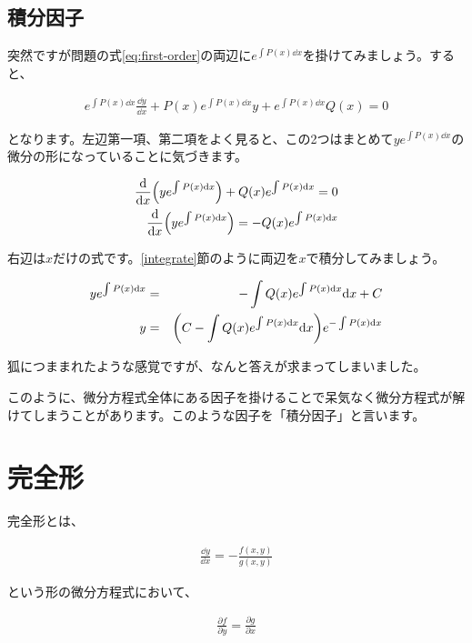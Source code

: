 \subsection{積分因子}
\label{first-order--integrating-factor}
突然ですが問題の式\ref{eq:first-order}の両辺に$e^{\int P(x)\dd x}$を掛けてみましょう。すると、

\begin{eqnarray}
    e^{\int P(x)\dd x}\frac{\dd y}{\dd x}+P(x)e^{\int P(x)\dd x}y+e^{\int P(x)\dd x}Q(x)=0
\end{eqnarray}

となります。左辺第一項、第二項をよく見ると、この2つはまとめて$ye^{\int P(x)\dd x}$の微分の形になっていることに気づきます。

\begin{eqnarray}
    \frac{\dd}{\dd x}\pqty{ye^{\int P(x)\dd x}}+Q(x)e^{\int P(x)\dd x}=0 \nonumber \\
    \frac{\dd}{\dd x}\pqty{ye^{\int P(x)\dd x}}=-Q(x)e^{\int P(x)\dd x}
\end{eqnarray}

右辺は$x$だけの式です。\ref{integrate}節のように両辺を$x$で積分してみましょう。


\begin{eqnarray}
    ye^{\int P(x)\dd x}&=&-\int Q(x)e^{\int P(x)\dd x} \dd x+C \nonumber \\
    y&=&\pqty{C-\int Q(x)e^{\int P(x)\dd x}\dd x}e^{-\int P(x)\dd x}
\end{eqnarray}

狐につままれたような感覚ですが、なんと答えが求まってしまいました。

このように、微分方程式全体にある因子を掛けることで呆気なく微分方程式が解けてしまうことがあります。このような因子を「積分因子」と言います。







\section{完全形}
\label{perfect}

完全形とは、

\begin{eqnarray}
    \frac{\dd y}{\dd x}=-\frac{f(x,y)}{g(x,y)}
    \label{eq:perfect}
\end{eqnarray}

\noindent
という形の微分方程式において、

\begin{eqnarray}
    \frac{\partial f}{\partial y}=\frac{\partial g}{\partial x}
    \label{eq:perfect-terms}
\end{eqnarray}

